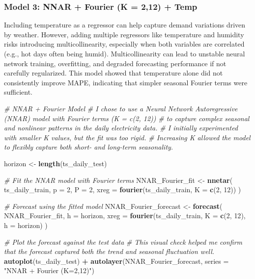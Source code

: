 \documentclass[
]{article}
\newenvironment{Shaded}{\begin{snugshade}}{\end{snugshade}}
\newcommand{\AttributeTok}[1]{\textcolor[rgb]{0.13,0.29,0.53}{#1}}
\newcommand{\CommentTok}[1]{\textcolor[rgb]{0.56,0.35,0.01}{\textit{#1}}}
\newcommand{\DecValTok}[1]{\textcolor[rgb]{0.00,0.00,0.81}{#1}}
\newcommand{\FunctionTok}[1]{\textcolor[rgb]{0.13,0.29,0.53}{\textbf{#1}}}
\newcommand{\NormalTok}[1]{#1}
\newcommand{\OtherTok}[1]{\textcolor[rgb]{0.56,0.35,0.01}{#1}}
\newcommand{\SpecialCharTok}[1]{\textcolor[rgb]{0.81,0.36,0.00}{\textbf{#1}}}
\newcommand{\StringTok}[1]{\textcolor[rgb]{0.31,0.60,0.02}{#1}}
\begin{document}
\subsubsection{Model 3: NNAR + Fourier (K = 2,12) +
Temp}\label{model-3-nnar-fourier-k-212-temp}

Including temperature as a regressor can help capture demand variations
driven by weather. However, adding multiple regressors like temperature
and humidity risks introducing multicollinearity, especially when both
variables are correlated (e.g., hot days often being humid).
Multicollinearity can lead to unstable neural network training,
overfitting, and degraded forecasting performance if not carefully
regularized. This model showed that temperature alone did not
consistently improve MAPE, indicating that simpler seasonal Fourier
terms were sufficient.

\begin{Shaded}
\begin{Highlighting}[]
\CommentTok{\# NNAR + Fourier Model}
\CommentTok{\# I chose to use a Neural Network Autoregressive (NNAR) model with Fourier terms (K = c(2, 12))}
\CommentTok{\# to capture complex seasonal and nonlinear patterns in the daily electricity data.}
\CommentTok{\# I initially experimented with smaller K values, but the fit was too rigid.}
\CommentTok{\# Increasing K allowed the model to flexibly capture both short{-} and long{-}term seasonality.}

\NormalTok{horizon }\OtherTok{\textless{}{-}} \FunctionTok{length}\NormalTok{(ts\_daily\_test)}

\CommentTok{\# Fit the NNAR model with Fourier terms}
\NormalTok{NNAR\_Fourier\_fit }\OtherTok{\textless{}{-}} \FunctionTok{nnetar}\NormalTok{(}
\NormalTok{  ts\_daily\_train, }
  \AttributeTok{p =} \DecValTok{2}\NormalTok{, }\AttributeTok{P =} \DecValTok{2}\NormalTok{, }
  \AttributeTok{xreg =} \FunctionTok{fourier}\NormalTok{(ts\_daily\_train, }\AttributeTok{K =} \FunctionTok{c}\NormalTok{(}\DecValTok{2}\NormalTok{, }\DecValTok{12}\NormalTok{))}
\NormalTok{)}

\CommentTok{\# Forecast using the fitted model}
\NormalTok{NNAR\_Fourier\_forecast }\OtherTok{\textless{}{-}} \FunctionTok{forecast}\NormalTok{(}
\NormalTok{  NNAR\_Fourier\_fit, }
  \AttributeTok{h =}\NormalTok{ horizon, }
  \AttributeTok{xreg =} \FunctionTok{fourier}\NormalTok{(ts\_daily\_train, }\AttributeTok{K =} \FunctionTok{c}\NormalTok{(}\DecValTok{2}\NormalTok{, }\DecValTok{12}\NormalTok{), }\AttributeTok{h =}\NormalTok{ horizon)}
\NormalTok{)}

\CommentTok{\# Plot the forecast against the test data}
\CommentTok{\# This visual check helped me confirm that the forecast captured both the trend and seasonal fluctuation well.}
\FunctionTok{autoplot}\NormalTok{(ts\_daily\_test) }\SpecialCharTok{+} 
  \FunctionTok{autolayer}\NormalTok{(NNAR\_Fourier\_forecast, }\AttributeTok{series =} \StringTok{"NNAR + Fourier (K=2,12)"}\NormalTok{)}
\end{Highlighting}
\end{Shaded}
\end{document}
